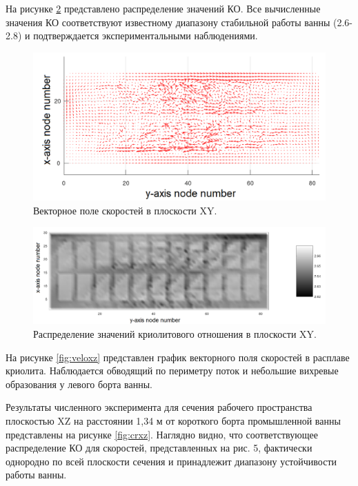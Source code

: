 \documentclass[pdflatex,sn-mathphys-gost]{pmi-jnl}
\begin{document}
На рисунке \ref{fig:crxy} представлено распределение значений КО. Все вычисленные значения КО соответствуют известному диапазону стабильной работы ванны (2.6-2.8) и подтверждается экспериментальными наблюдениями.

\begin{figure}[ht]
    \centering
    \includegraphics[width=\textwidth]{veloxy_art.png}
    \caption{Векторное поле скоростей в плоскости XY.}
    \label{fig:veloxy}
\end{figure}

\begin{figure}[ht]
    \centering
    \includegraphics[width=\textwidth]{crxy_art.png}
    \caption{Распределение значений криолитового отношения в плоскости XY.}
    \label{fig:crxy}
\end{figure}

На рисунке \ref{fig:veloxz} представлен график векторного поля скоростей в расплаве криолита. Наблюдается обводящий по периметру поток и небольшие вихревые образования у левого борта ванны.

Результаты численного эксперимента для сечения рабочего пространства плоскостью XZ на расстоянии 1,34 м от короткого борта промышленной ванны представлены на рисунке \ref{fig:crxz}. Наглядно видно, что соответствующее распределение КО для скоростей, представленных на рис. 5, фактически однородно по всей плоскости сечения и принадлежит диапазону устойчивости работы ванны.
\end{document}
